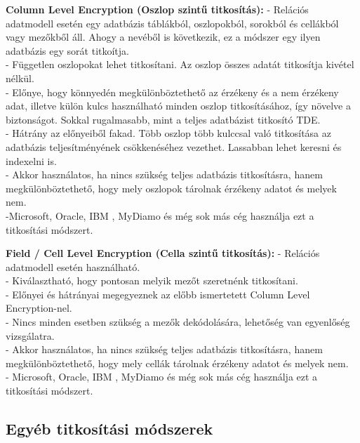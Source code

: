 \vspace{25pt}
\noindent\textbf{Column Level Encryption (Oszlop szintű titkosítás):}\newline
\noindent - Relációs adatmodell esetén egy adatbázis táblákból, oszlopokból, sorokból és cellákból vagy mezőkből áll. Ahogy a nevéből is következik, ez a módszer egy ilyen adatbázis egy sorát titkoítja.
\\- Független oszlopokat lehet titkosítani. Az oszlop összes adatát titkosítja kivétel nélkül. 
\\- Előnye, hogy könnyedén megkülönböztethető az érzékeny és a nem érzékeny adat, illetve külön kulcs használható minden oszlop titkosításához, így növelve a biztonságot. Sokkal rugalmasabb, mint a teljes adatbázist titkosító TDE.
\\- Hátrány az előnyeiből fakad. Több oszlop több kulccsal való titkosítása az adatbázis teljesítményének csökkenéséhez vezethet. Lassabban lehet keresni és indexelni is.
\\- Akkor használatos, ha nincs szükség teljes adatbázis titkosításra, hanem megkülönböztethető, hogy mely oszlopok tárolnak érzékeny adatot és melyek nem.
\\-Microsoft, Oracle, IBM , MyDiamo és még sok más cég használja ezt a titkosítási módszert.

\vspace{25pt}
\noindent\textbf{Field / Cell Level Encryption (Cella szintű titkosítás):}\newline
\noindent- Relációs adatmodell esetén használható.
\\- Kiválasztható, hogy pontosan melyik mezőt szeretnénk titkosítani. 
\\- Előnyei és hátrányai megegyeznek az előbb ismertetett Column Level Encryption-nel. 
\\- Nincs minden esetben szükség a mezők dekódolására, lehetőség van egyenlőség vizsgálatra.
\\- Akkor használatos, ha nincs szükség teljes adatbázis titkosításra, hanem megkülönböztethető, hogy mely cellák tárolnak érzékeny adatot és melyek nem.
\\- Microsoft, Oracle, IBM , MyDiamo és még sok más cég használja ezt a titkosítási módszert.




\subsection{Egyéb titkosítási módszerek}

